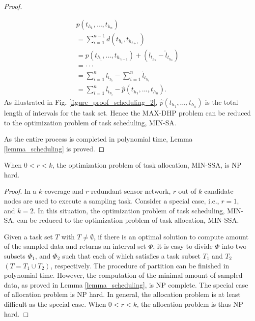 \documentclass[prodmode,acmtosn]{acmsmall}
\begin{document}
\begin{proof}
\begin{itemize}
    \begin{equation}
    \begin{array}{ll}
    p(t_{h_1}, ..., t_{h_n}) \\
    = \sum^{n-1}_{i=1} {d(t_{h_i},t_{h_{i+1}})}\\
    = p(t_{h_1}, ..., t_{h_{n-1}})+(l_{t_{h_n}}-\widehat{l}_{t_{h_n}})\\
    = \cdot\cdot\cdot  \\ =\sum^{n}_{i=1}l_{t_{h_i}}-\sum^{n}_{i=1}\widehat{l}_{t_{h_i}}\\
    =\sum^{n}_{i=1}l_{t_{h_i}}-\widehat{p}(t_{h_1}, ..., t_{h_n}).
    \end{array}
    \end{equation}
    As illustrated in Fig. \ref{figure_proof_scheduling_2}, $\widehat{p}(t_{h_1},..., t_{h_n})$ is the total length of intervals for the task set. Hence the MAX-DHP problem can be reduced to the optimization problem of task scheduling, MIN-SA.
\end{itemize}
As the entire process is completed in polynomial time, Lemma \ref{lemma_scheduling} is proved.
\end{proof}


\begin{theorem}
\label{theorem_problem_allocation}
When $0 \mathrm{<} r \mathrm{<}k$, the optimization problem of task allocation, MIN-SSA,  is NP hard.
\end{theorem}

\begin{proof}
In a $k$-coverage and $r$-redundant sensor network, $r$ out of $k$ candidate nodes are used to execute a sampling task. Consider a special case, i.e., $r\mathrm{=}1$, and $k\mathrm{=}2$. In this situation, the optimization problem of task scheduling, MIN-SA, can be reduced to the optimization problem of task allocation, MIN-SSA.

Given a task set $T$ with $T \mathrm{\neq} \emptyset$, if there is an optimal solution to compute amount of the sampled data and returns an interval set $\Phi$, it is easy to divide $\Phi$ into two subsets $\Phi_1$, and $\Phi_2$ such that each of which satisfies a task subset $T_1$ and $T_2$ $(T\mathrm{=}T_1\cup T_2)$, respectively. The procedure of partition can be finished in polynomial time. However, the computation of the minimal amount of sampled data, as proved in Lemma \ref{lemma_scheduling}, is NP complete. The special case of allocation problem is NP hard. In general, the allocation problem is at least difficult as the special case. When $0 \mathrm{<} r \mathrm{<}k$, the allocation problem is thus NP hard.
\end{proof}
\end{document}
